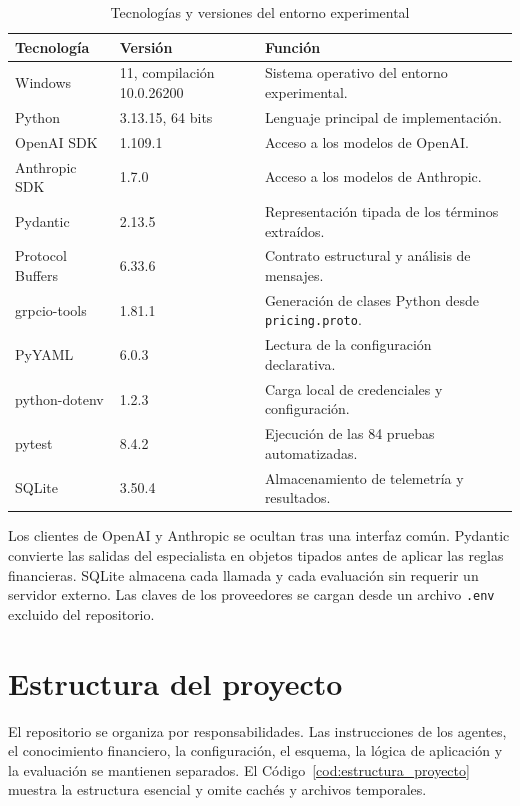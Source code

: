 \begin{table}[H]
\centering
\small
\caption{Tecnologías y versiones del entorno experimental}
\label{tab:tecnologias_versiones}
\begin{tabular}{|P{4.0cm}|P{3.0cm}|P{6.3cm}|}
\hline
\textbf{Tecnología} & \textbf{Versión} & \textbf{Función} \\
\hline
Windows & 11, compilación 10.0.26200 & Sistema operativo del entorno experimental. \\
\hline
Python & 3.13.15, 64 bits & Lenguaje principal de implementación. \\
\hline
OpenAI SDK & 1.109.1 & Acceso a los modelos de OpenAI. \\
\hline
Anthropic SDK & 1.7.0 & Acceso a los modelos de Anthropic. \\
\hline
Pydantic & 2.13.5 & Representación tipada de los términos extraídos. \\
\hline
Protocol Buffers & 6.33.6 & Contrato estructural y análisis de mensajes. \\
\hline
grpcio-tools & 1.81.1 & Generación de clases Python desde \texttt{pricing.proto}. \\
\hline
PyYAML & 6.0.3 & Lectura de la configuración declarativa. \\
\hline
python-dotenv & 1.2.3 & Carga local de credenciales y configuración. \\
\hline
pytest & 8.4.2 & Ejecución de las 84 pruebas automatizadas. \\
\hline
SQLite & 3.50.4 & Almacenamiento de telemetría y resultados. \\
\hline
\end{tabular}
\end{table}

Los clientes de OpenAI y Anthropic se ocultan tras una interfaz común. Pydantic convierte las salidas del especialista en objetos tipados antes de aplicar las reglas financieras. SQLite almacena cada llamada y cada evaluación sin requerir un servidor externo. Las claves de los proveedores se cargan desde un archivo \texttt{.env} excluido del repositorio.

\section{Estructura del proyecto}
\label{sec:estructura_proyecto}

El repositorio se organiza por responsabilidades. Las instrucciones de los agentes, el conocimiento financiero, la configuración, el esquema, la lógica de aplicación y la evaluación se mantienen separados. El Código~\ref{cod:estructura_proyecto} muestra la estructura esencial y omite cachés y archivos temporales.

